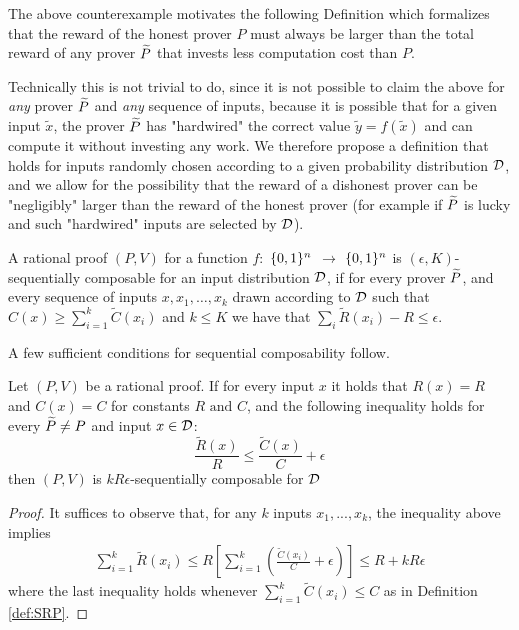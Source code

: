
The above counterexample motivates the following Definition which formalizes 
that the reward of the honest prover $P$ must always be larger than the total 
reward of any prover $\widetilde{P}$ that invests less computation cost than $P$. 

Technically this is not trivial to do, since it is not possible to claim the above for {\em any} prover $\widetilde{P}$ and {\em any} sequence of inputs, because it
is possible that for a given input $\tilde{x}$, the prover $\widetilde{P}$ has "hardwired" the correct value $\tilde{y}=f(\tilde{x})$ and can compute it without investing 
any work. We therefore propose a definition that holds for inputs randomly chosen according to a given probability distribution $\cal D$, and we allow for
the possibility that the reward of a dishonest prover can be "negligibly" larger than the reward of the honest prover (for example if $\widetilde{P}$ is lucky and such 
"hardwired" inputs are selected by $\cal D$).

\noindent
\begin{definition}
	\label{def:SRP}
	A rational proof $(P,V)$ for a function $f:$ $\{0, 1\}^n$ $\to$ 
	$\{0, 1\}^n$ is $(\epsilon, K)$-{\sf sequentially composable} for an input distribution $\cal D$, if for every prover $\widetilde{P}$, 
	and every sequence of inputs 
	$x,x_1,\ldots,x_k$ drawn according to ${\cal D}$ such that $C(x) \geq \sum_{i=1}^k 
	\tilde{C}(x_i)$ and $k \leq K$ we have that $\sum_{i}\tilde{R}(x_i) - R \leq \epsilon$.
\end{definition}

\noindent
A few sufficient conditions for sequential composability follow.

\begin{lemma}
\label{lemma:cost-rew-ratios}
Let $(P,V)$ be a rational proof.
If for every input $x$  it holds that $R(x)=R$ and  $C(x)=C$ for constants 
$R \mbox{ and } C$, and the 
following inequality holds for every 
$\widetilde{P}\neq 
P$ and input $x\in {\cal D}$:
\[ \frac{\tilde{R}(x)}{R} \leq \frac{\tilde{C}(x)}{C} + \epsilon\]
then $(P,V)$ is $kR\epsilon$-sequentially composable for $\cal D$
\end{lemma}
\begin{proof}
It suffices to observe that, for any $k$ inputs $x_1,...,x_k$, the inequality 
above 
implies
\begin{align*}
\sum_{i=1}^{k}\tilde{R}(x_i)  \leq R [\sum_{i=1}^{k} (\frac{\tilde{C}(x_i)}{C}  + \epsilon) ] 
\leq R +kR\epsilon
\end{align*}
where the last inequality holds whenever $\sum_{i=1}^{k} \tilde{C}(x_i) \leq C$ 
as 
in Definition \ref{def:SRP}.
\end{proof}


